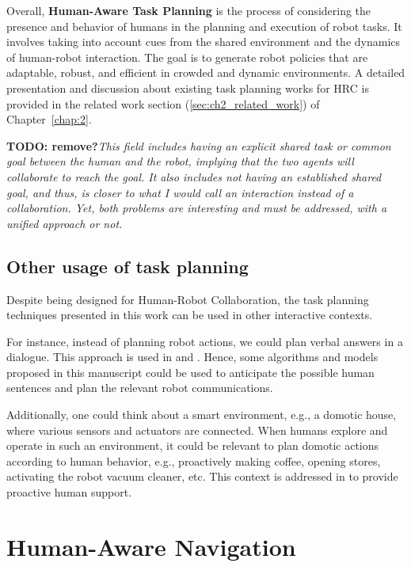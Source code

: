 Overall, \textbf{Human-Aware Task Planning} is the process of considering the presence and behavior of humans in the planning and execution of robot tasks. It involves taking into account cues from the shared environment and the dynamics of human-robot interaction. The goal is to generate robot policies that are adaptable, robust, and efficient in crowded and dynamic environments. A detailed presentation and discussion about existing task planning works for HRC is provided in the related work section (\ref{sec:ch2_related_work}) of Chapter~\ref{chap:2}.  

\textbf{TODO: remove?}\textit{This field includes having an explicit shared task or common goal between the human and the robot, implying that the two agents will collaborate to reach the goal. It also includes not having an established shared goal, and thus, is closer to what I would call an interaction instead of a collaboration. Yet, both problems are interesting and must be addressed, with a unified approach or not. }

\subsection{Other usage of task planning}

Despite being designed for Human-Robot Collaboration, the task planning techniques presented in this work can be used in other interactive contexts. 

For instance, instead of planning robot actions, we could plan verbal answers in a dialogue. 
This approach is used in \cite{de_carolis_verbal_2000} and \cite{de_carolis_behavior_2001}.
Hence, some algorithms and models proposed in this manuscript could be used to anticipate the possible human sentences and plan the relevant robot communications. 

Additionally, one could think about a smart environment, e.g., a domotic house, where various sensors and actuators are connected. When humans explore and operate in such an environment, it could be relevant to plan domotic actions according to human behavior, e.g., proactively making coffee, opening stores, activating the robot vacuum cleaner, etc. This context is addressed in \cite{pecora_constraint_based_2012} to provide proactive human support.


\section{Human-Aware Navigation}

